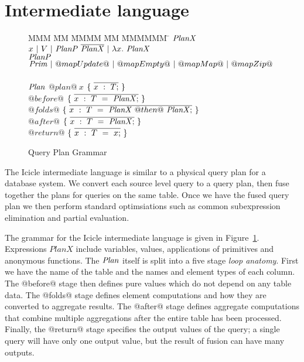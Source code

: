 \section{Intermediate language}
\label{s:IcicleCore}

\begin{figure}

\begin{tabbing}
MMM \= MM \= MMMM \= MM \= MMMMMM \= \kill
$\mathit{PlanX}$
\GrammarDef
  $x~|~V~|~\mathit{PlanP}~\overline{\mathit{PlanX}}~|~\lambda{}x.~\mathit{PlanX}$
\\
$\mathit{PlanP}$
\GrammarDef
  $\mathit{Prim}~|~@mapUpdate@~|~@mapEmpty@~|~@mapMap@~|~@mapZip@$
\\
\\
$\mathit{Plan}$
\GrammarDef
  $@plan@~x$ \> $\{~\overline{x~:~T;}~\}$
\\
  \> \> $@before@$ \> $\{~\overline{x~:~T~=~\mathit{PlanX};}~\}$ \\
  \> \> $@folds@$  \> $\{~\overline{x~:~T~=~\mathit{PlanX}~@then@~\mathit{PlanX};}~\}$ \\
  \> \> $@after@$  \> $\{~\overline{x~:~T~=~\mathit{PlanX};}~\}$ \\
  \> \> $@return@$ \> $\{~\overline{x~:~T~=~x;}~\}$ \\
\end{tabbing}



\caption{Query Plan Grammar}
\label{fig:core:grammar}
\end{figure}

The Icicle intermediate language is similar to a physical query plan for a database system. We convert each source level query to a query plan, then fuse together the plans for queries on the same table. Once we have the fused query plan we then perform standard optimsiations such as common subexpression elimination and partial evaluation.

The grammar for the Icicle intermediate language is given in Figure~\ref{fig:core:grammar}.
Expressions $PlanX$ include variables, values, applications of primitives and anonymous functions.
The $\mathit{Plan}$ itself is split into a five stage \emph{loop anatomy}. First we have the name of the table and the names and element types of each column. The @before@ stage then defines pure values which do not depend on any table data. The @folds@ stage defines element computations and how they are converted to aggregate results. The @after@ stage defines aggregate computations that combine multiple aggregations after the entire table has been processed. Finally, the @return@ stage specifies the output values of the query; a single query will have only one output value, but the result of fusion can have many outputs.

